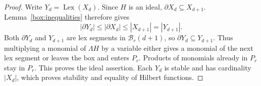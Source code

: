 \begin{proof}
Write \(Y_d=\operatorname{Lex}(X_d)\).  Since \(H\) is an ideal,
\(\partial X_d\subseteq X_{d+1}\).  Lemma~\ref{box:inequalities}
therefore gives
\[
 |\partial Y_d|\le|\partial X_d|
                  \le|X_{d+1}|=|Y_{d+1}|.
\]
Both \(\partial Y_d\) and \(Y_{d+1}\) are lex segments in
\(\mathcal B_r(d+1)\), so \(\partial Y_d\subseteq Y_{d+1}\).
Thus multiplying a monomial of \(\Lambda H\) by a variable either
gives a monomial of the next lex segment or leaves the box and
enters \(P_r\).  Products of monomials already in \(P_r\) stay in
\(P_r\).  This proves the ideal assertion.  Each \(Y_d\) is stable
and has cardinality \(|X_d|\), which proves stability and equality
of Hilbert functions.
\end{proof}

